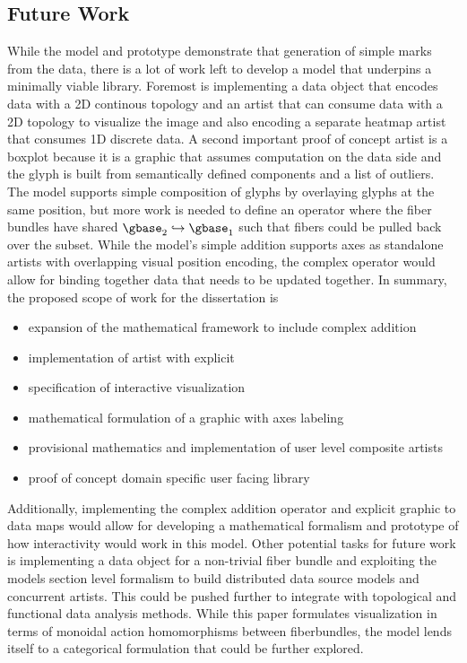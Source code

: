\documentclass[../main.tex]{subfiles}
\begin{document}
\subsection{Future Work}
While the model and prototype demonstrate that generation of simple marks from the data, there is a lot of work left to develop a model that underpins a minimally viable library. Foremost is implementing a data object that encodes data with a 2D continous topology and an artist that can consume data with a 2D topology to visualize the image\cite{toryRethinkingVisualizationHighLevel2004,haber1990visualization,hansen2011visualization} and also encoding a separate heatmap\cite{wilkinsonHistoryClusterHeat2009,loua1873atlas} artist that consumes 1D discrete data.  A second important proof of concept artist is a boxplot\cite{wickham40YearsBoxplots2011} because it is a graphic that assumes computation on the data side and the glyph is built from semantically defined components and a list of outliers. The model supports simple composition of glyphs by overlaying glyphs at the same position, but more work is needed to define an operator where the fiber bundles have shared $\gbase_2 \hookrightarrow \gbase_1$ such that fibers could be pulled back over the subset. While the model's simple addition supports axes as standalone artists with overlapping visual position encoding, the complex operator would allow for binding together data that needs to be updated together.
In summary, the proposed scope of work for the dissertation is
\begin{itemize}
    \item expansion of the mathematical framework to include complex addition
    \item implementation of artist with explicit \vindex\
    \item specification of interactive visualization
    \item mathematical formulation of a graphic with axes labeling
    \item provisional mathematics and implementation of user level composite artists
    \item proof of concept domain specific user facing library 
\end{itemize}
Additionally, implementing the complex addition operator and explicit graphic to data maps would allow for developing a mathematical formalism and prototype of how interactivity would work in this model. Other potential tasks for future work is implementing a data object for a non-trivial fiber bundle and exploiting the models section level formalism to build distributed data source models and concurrent artists. This could be pushed further to integrate with topological\cite{heineSurveyTopologybasedMethods2016} and functional \cite{ramsayFunctionalDataAnalysis2006a} data analysis methods. While this paper formulates visualization in terms of monoidal action homomorphisms between fiberbundles, the model lends itself to a categorical formulation\cite{fongInvitationAppliedCategory2019,milewskiCategoryTheoryProgrammers} that could be further explored. 
\end{document}
